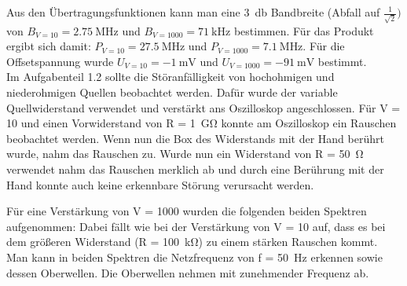 \documentclass{article}						%
\begin{document}
		Aus den Übertragungsfunktionen kann man eine \SI{3}{\decibel} Bandbreite (Abfall auf $ \frac{1}{\sqrt{2}}) $ von $ B_{V=10} = \SI{2,75}{\mega\hertz} $ und $ B_{V=1000} = \SI{71}{\kilo\hertz} $ bestimmen.  Für das Produkt ergibt sich damit: $ P_{V=10}=\SI{27,5}{\mega\hertz} $ und $ P_{V=1000} = \SI{7,1}{\mega\hertz} $. Für die Offsetspannung wurde $ U_{V=10} = \SI{-1}{\milli\volt} $ und $ U_{V=1000} = \SI{-91}{\milli\volt} $ bestimmt. \\
		
		Im Aufgabenteil 1.2 sollte die Störanfälligkeit von hochohmigen und niederohmigen Quellen beobachtet werden. Dafür wurde der variable Quellwiderstand verwendet und verstärkt ans Oszilloskop angeschlossen.
		Für V = 10 und einen Vorwiderstand von R = \SI{1}{\giga\ohm} konnte am Oszilloskop ein Rauschen beobachtet werden. Wenn nun die Box des Widerstands mit der Hand berührt wurde, nahm das Rauschen zu. Wurde nun ein Widerstand von R = \SI{50}{\ohm} verwendet nahm das Rauschen merklich ab und durch eine Berührung mit der Hand konnte auch keine erkennbare Störung verursacht werden.
		
		Für eine Verstärkung von V = 1000 wurden die folgenden beiden Spektren aufgenommen: Dabei fällt wie bei der Verstärkung von V = 10 auf, dass es bei dem größeren Widerstand (R = \SI{100}{\kilo\ohm}) zu einem stärken Rauschen kommt. Man kann in beiden Spektren die Netzfrequenz von f = \SI{50}{\hertz} erkennen sowie dessen Oberwellen. Die Oberwellen nehmen mit zunehmender Frequenz ab.
		\clearpage
		
\end{document}
